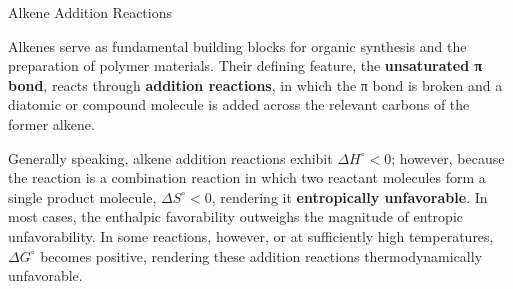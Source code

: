 \documentclass[10pt]{article}
\begin{document}
    \begin{core}{Alkene Addition Reactions}

      Alkenes serve as fundamental building blocks for organic synthesis and the preparation of polymer materials. Their defining feature, the \textbf{unsaturated π bond}, reacts through \textbf{addition reactions}, in which the π bond is broken and a diatomic or compound molecule is added across the relevant carbons of the former alkene.


      Generally speaking, alkene addition reactions exhibit $ΔH^{\circ} < 0$; however, because the reaction is a combination reaction in which two reactant molecules form a single product molecule, $ΔS^{\circ} < 0$, rendering it \textbf{entropically unfavorable}. In most cases, the enthalpic favorability outweighs the magnitude of entropic unfavorability. In some reactions, however, or at sufficiently high temperatures, $ΔG^{\circ}$ becomes positive, rendering these addition reactions thermodynamically unfavorable.


    \end{core}
    
\end{document}
